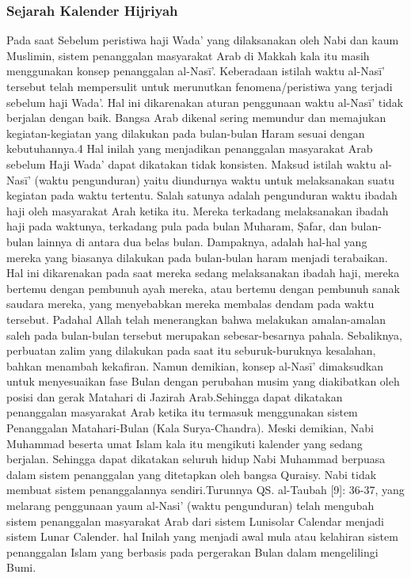     \subsubsection{Sejarah Kalender Hijriyah}

      Pada saat Sebelum peristiwa haji Wada’ yang dilaksanakan oleh Nabi dan kaum Muslimin, sistem penanggalan masyarakat Arab di Makkah kala itu masih menggunakan konsep penanggalan al-Nasī’. Keberadaan istilah waktu al-Nasī’ tersebut telah mempersulit untuk merunutkan fenomena/peristiwa yang terjadi sebelum haji Wada’\cite{setyanto2015kriteria}.
    Hal ini dikarenakan aturan penggunaan waktu al-Nasī’ tidak berjalan dengan baik. Bangsa Arab dikenal sering memundur dan memajukan kegiatan-kegiatan yang dilakukan pada bulan-bulan Haram sesuai dengan kebutuhannya.4 Hal inilah yang menjadikan penanggalan masyarakat Arab sebelum Haji Wada’ dapat dikatakan tidak konsisten.
    Maksud istilah waktu al-Nasī’ (waktu pengunduran) yaitu diundurnya waktu untuk melaksanakan suatu kegiatan pada waktu tertentu. Salah satunya adalah pengunduran waktu ibadah haji oleh masyarakat Arah ketika itu. Mereka terkadang melaksanakan ibadah haji pada waktunya, terkadang pula pada bulan Muharam, Ṣafar, dan bulan-bulan lainnya di antara dua belas bulan.
    Dampaknya, adalah hal-hal yang mereka yang biasanya dilakukan pada bulan-bulan haram menjadi terabaikan. Hal ini dikarenakan pada saat mereka sedang melaksanakan ibadah haji, mereka bertemu dengan pembunuh ayah mereka, atau bertemu dengan pembunuh sanak saudara mereka, yang menyebabkan mereka membalas dendam pada waktu tersebut.
    Padahal Allah telah menerangkan bahwa melakukan amalan-amalan saleh pada bulan-bulan tersebut merupakan sebesar-besarnya pahala. Sebaliknya, perbuatan zalim yang dilakukan pada saat itu seburuk-buruknya kesalahan, bahkan menambah kekafiran.
    Namun demikian, konsep al-Nasī’ dimaksudkan untuk menyesuaikan fase Bulan dengan perubahan musim yang diakibatkan oleh posisi dan gerak Matahari di Jazirah Arab.Sehingga dapat dikatakan penanggalan masyarakat Arab ketika itu termasuk menggunakan sistem Penanggalan Matahari-Bulan (Kala Surya-Chandra).
    Meski demikian, Nabi Muhammad beserta umat Islam kala itu mengikuti kalender yang sedang berjalan. Sehingga dapat dikatakan seluruh hidup Nabi Muhammad berpuasa dalam sistem penanggalan yang ditetapkan oleh bangsa Quraisy. Nabi tidak membuat sistem penanggalannya sendiri.Turunnya QS.
    al-Taubah [9]: 36-37, yang melarang penggunaan yaum al-Nasi’ (waktu pengunduran) telah mengubah sistem penanggalan masyarakat Arab dari sistem Lunisolar Calendar menjadi sistem Lunar Calender. hal Inilah yang menjadi awal mula atau kelahiran sistem penanggalan Islam yang berbasis pada pergerakan Bulan dalam mengelilingi Bumi.

